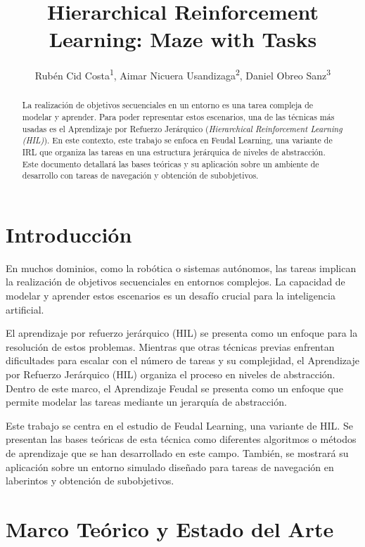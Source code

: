 \documentclass[letterpaper]{article} %
\title{Hierarchical Reinforcement Learning: Maze with Tasks}
\author {
    Rubén Cid Costa\textsuperscript{\rm 1},
    Aimar Nicuera Usandizaga\textsuperscript{\rm 2},
    Daniel Obreo Sanz\textsuperscript{\rm 3}
}
\begin{document}
\maketitle

\begin{abstract}
La realización de objetivos secuenciales en un entorno es una tarea compleja de modelar y aprender. Para poder representar estos
escenarios, una de las técnicas más usadas es el Aprendizaje por Refuerzo Jerárquico (\textit{Hierarchical Reinforcement Learning (HIL)}).
En este contexto, este trabajo se enfoca en Feudal Learning, una variante de IRL que organiza las tareas en una estructura jerárquica de
niveles de abstracción. Este documento detallará las bases teóricas y su aplicación sobre un ambiente de desarrollo con tareas de navegación y
obtención de subobjetivos.
\end{abstract}

\section{Introducción}

En muchos dominios, como la robótica o sistemas autónomos, las tareas implican la realización de objetivos secuenciales en entornos complejos.
La capacidad de modelar y aprender estos escenarios es un desafío crucial para la inteligencia artificial.

El aprendizaje por refuerzo jerárquico (HIL) se presenta como un enfoque para la resolución de estos problemas. Mientras que otras técnicas previas
enfrentan dificultades para escalar con el número de tareas y su complejidad, el Aprendizaje por Refuerzo Jerárquico (HIL) organiza el proceso en 
niveles de abstracción. Dentro de este marco, el Aprendizaje Feudal se presenta como un enfoque que permite modelar las tareas mediante un jerarquía
de abstracción.

Este trabajo se centra en el estudio de Feudal Learning, una variante de HIL. Se presentan las bases teóricas de esta técnica como diferentes algoritmos
o métodos de aprendizaje que se han desarrollado en este campo. También, se mostrará su aplicación sobre un entorno simulado diseñado para tareas 
de navegación en laberintos y obtención de subobjetivos. 

\section{Marco Teórico y Estado del Arte}
\end{document}

